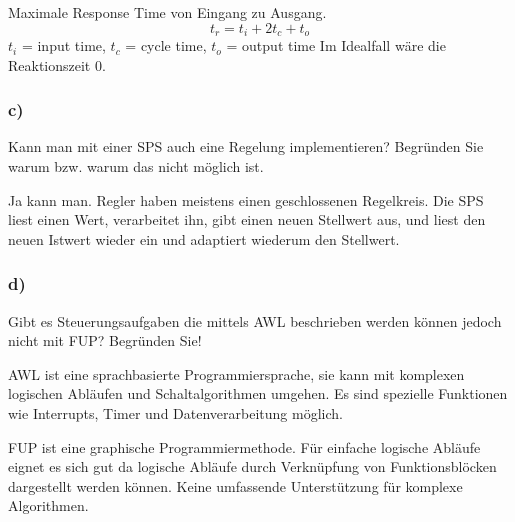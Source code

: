 Maximale Response Time von Eingang zu Ausgang.
\begin{equation}
  t_r = t_i + 2t_c + t_o
\end{equation}
$t_i$ = input time, $t_c$ = cycle time, $t_o$ = output time
Im Idealfall wäre die Reaktionszeit 0.


\subsubsection{c)}
Kann man mit einer SPS auch eine Regelung implementieren? Begründen Sie warum bzw. warum
das nicht möglich ist.

Ja kann man. Regler haben meistens einen geschlossenen Regelkreis. Die SPS liest einen Wert, verarbeitet ihn,
gibt einen neuen Stellwert aus, und liest den neuen Istwert wieder ein und adaptiert wiederum den Stellwert.

\subsubsection{d)}
Gibt es Steuerungsaufgaben die mittels AWL beschrieben werden können jedoch nicht mit FUP?
Begründen Sie!

AWL ist eine sprachbasierte Programmiersprache, sie kann mit komplexen logischen Abläufen und Schaltalgorithmen umgehen.
Es sind spezielle Funktionen wie Interrupts, Timer und Datenverarbeitung möglich.

FUP ist eine graphische Programmiermethode. Für einfache logische Abläufe eignet es sich gut da logische Abläufe durch 
Verknüpfung von Funktionsblöcken dargestellt werden können. Keine umfassende Unterstützung für komplexe Algorithmen.